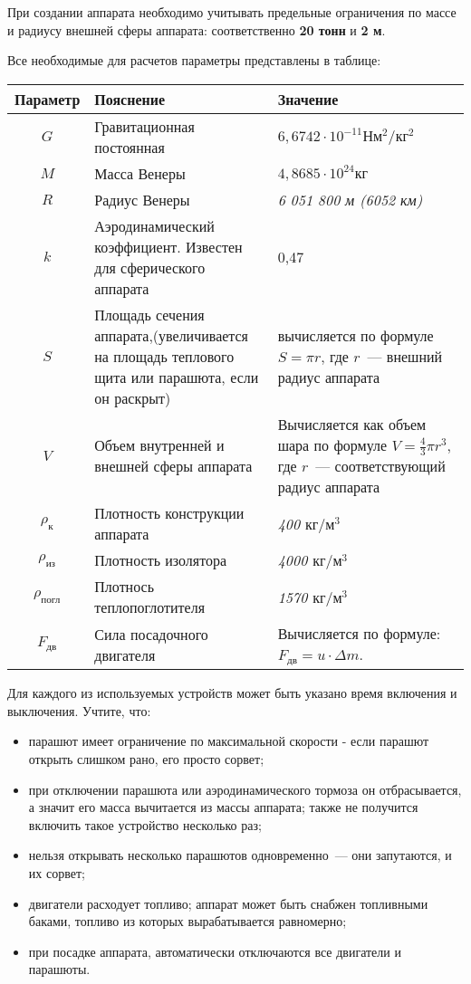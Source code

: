 \documentclass[12pt,a4paper]{article}
\begin{document}
При создании аппарата необходимо учитывать предельные ограничения по массе и радиусу
внешней сферы аппарата: соответственно \textbf{20 тонн} и \textbf{2 м}.

Все необходимые для расчетов параметры представлены в таблице:

\begin{center}
\begin{tabular}{ |c|p{6.5cm}|p{6cm}| } 
  \hline
  \textbf{Параметр} & \textbf{Пояснение} & \textbf{Значение} \\
  \hline
  $ G $ & Гравитационная постоянная & $ 6,6742 \cdot 10^{-11} \text{Н} \text{м}^{2}/\text{кг}^{2} $ \\
  \hline
  $ M $ & Масса Венеры & $4,8685 \cdot 10^{24} \text{кг}$ \\
  \hline
  $ R $ & Радиус Венеры & \emph{6 051 800 м (6052 км)} \\
  \hline
  $ k $ & Аэродинамический коэффициент. Известен для сферического аппарата & 0,47 \\
  \hline
  $ S $ & Площадь сечения аппарата,(увеличивается на площадь
  теплового щита или парашюта, если он раскрыт) & вычисляется по формуле $ S = \pi r $,
  где $r$~--- внешний радиус
  аппарата \\
  \hline
  $ V $ & Объем внутренней и внешней сферы аппарата & Вычисляется как объем шара по формуле $V = \frac{4}{3} \pi
    r^3$, где $r$~--- соответствующий радиус аппарата\\
  \hline
  $ \rho_{\text{к}} $ & Плотность конструкции аппарата & \emph{400 $\text{кг}/\text{м}^3$} \\
  \hline
  $ \rho_{\text{из}} $ & Плотность изолятора & \emph{4000 $\text{кг}/\text{м}^3$} \\
  \hline
  $ \rho_{\text{погл}} $ & Плотнось теплопоглотителя & \emph{1570 $\text{кг}/\text{м}^3$} \\
  \hline
  $ F_{\text{дв}} $ & Сила посадочного двигателя &
  Вычисляется по формуле: $ F_{\text{дв}} = u \cdot \Delta m$.\\
  \hline
\end{tabular}
\end{center}

Для каждого из используемых устройств может быть указано время включения и
выключения. Учтите, что:

\begin{itemize}
  \item парашют имеет ограничение по максимальной скорости - если парашют открыть слишком рано, его просто сорвет;
  \item при отключении парашюта или аэродинамического тормоза он отбрасывается, а значит
    его масса вычитается из массы аппарата; также не получится включить такое устройство
    несколько раз;
  \item нельзя открывать несколько парашютов одновременно~--- они запутаются, и их сорвет;
  \item двигатели расходует топливо; аппарат может быть снабжен топливными баками, топливо
    из которых вырабатывается равномерно;
  \item при посадке аппарата, автоматически отключаются все двигатели и парашюты.
\end{itemize}
\end{document}
